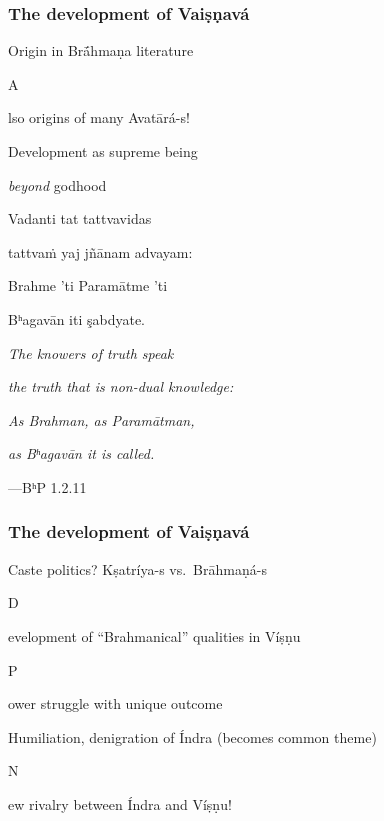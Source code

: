 \documentclass[pdf]{beamer}
\newcommand{\Subitem}[1]{{\setlength\itemindent{12pt} \item[-] #1}}
\begin{document}
\begin{frame} \frametitle{The development of Vaiṣṇavá}
\begin{itemize}
	\item Origin in Brā́hmaṇa literature
	\Subitem Also origins of many Avatārá-s!
	\item Development as supreme being
	\Subitem {\emph{beyond} godhood}
\end{itemize}

\begin{center}
	Vadanti tat tattvavidas

	tattvaṁ yaj jñānam advayam:

	Brahme 'ti Paramātme 'ti

	Bʰagavān iti şabdyate.

	\vspace{\baselineskip}

	\textit{The knowers of truth speak}

	\textit{the truth that is non-dual knowledge:}

	\textit{As Brahman, as Paramātman,}

	\textit{as Bʰagavān it is called.}

	\vspace{\baselineskip}

	---BʰP 1.2.11
\end{center}
\end{frame}

\begin{frame} \frametitle{The development of Vaiṣṇavá}
\begin{itemize}
	\item Caste politics? Kṣatríya-s vs.~Brāhmaṇá-s
	\Subitem Development of ``Brahmanical'' qualities in Víṣṇu
	\Subitem Power struggle with unique outcome
	\item Humiliation, denigration of Índra (becomes common theme)
	\Subitem New rivalry between Índra and Víṣṇu!
\end{itemize}
\end{frame}

\end{document}
